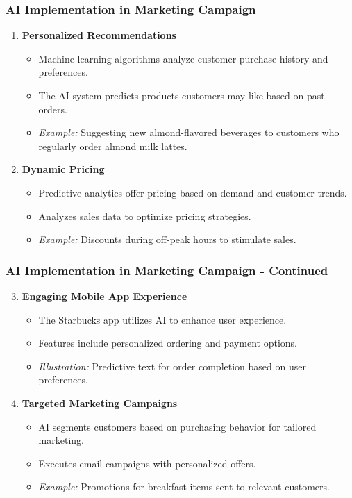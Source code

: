 \documentclass{beamer}
\begin{document}
\begin{frame}[fragile]
    \frametitle{AI Implementation in Marketing Campaign}
    \begin{enumerate}
        \item \textbf{Personalized Recommendations}
            \begin{itemize}
                \item Machine learning algorithms analyze customer purchase history and preferences.
                \item The AI system predicts products customers may like based on past orders.
                \item \textit{Example:} Suggesting new almond-flavored beverages to customers who regularly order almond milk lattes.
            \end{itemize}
        \item \textbf{Dynamic Pricing}
            \begin{itemize}
                \item Predictive analytics offer pricing based on demand and customer trends.
                \item Analyzes sales data to optimize pricing strategies.
                \item \textit{Example:} Discounts during off-peak hours to stimulate sales.
            \end{itemize}
    \end{enumerate}
\end{frame}

\begin{frame}[fragile]
    \frametitle{AI Implementation in Marketing Campaign - Continued}
    \begin{enumerate}
        \setcounter{enumi}{2}
        \item \textbf{Engaging Mobile App Experience}
            \begin{itemize}
                \item The Starbucks app utilizes AI to enhance user experience.
                \item Features include personalized ordering and payment options.
                \item \textit{Illustration:} Predictive text for order completion based on user preferences.
            \end{itemize}
        \item \textbf{Targeted Marketing Campaigns}
            \begin{itemize}
                \item AI segments customers based on purchasing behavior for tailored marketing.
                \item Executes email campaigns with personalized offers.
                \item \textit{Example:} Promotions for breakfast items sent to relevant customers.
            \end{itemize}
    \end{enumerate}
\end{frame}
\end{document}

